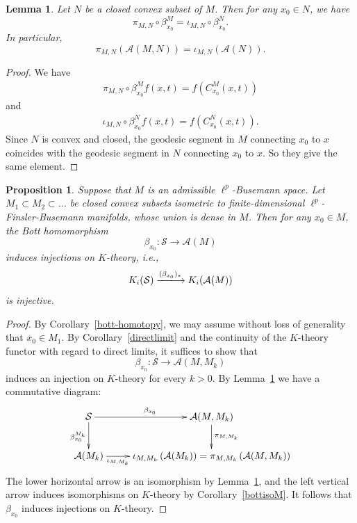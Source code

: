 \documentclass{article}
\theoremstyle{plain}
\newtheorem{lemma}[theorem]{Lemma}
\newtheorem{proposition}[theorem]{Proposition}
\theoremstyle{definition}
\theoremstyle{remark}
\def\A{\mathcal A}
\def\S{\mathcal S}
\begin{document}
	\begin{lemma}\label{AMN-AM}
		Let $N$ be a closed convex subset of $M$. Then for any $x_0 \in N$, we have
		\[
		\pi_{M,N} \circ \beta_{x_0}^M= \iota_{M,N} \circ \beta_{x_0}^N.
		\]
		In particular,
		\[
		\pi_{M,N}(\A(M,N)) = \iota_{M,N}(\A(N)).
		\]
	\end{lemma}
	
	\begin{proof}
		We have
		\begin{align*}
			\pi_{M,N} \circ \beta_{x_0}^Mf(x,t) = f\left(C^M_{x_0}(x,t) \right)
		\end{align*}
		and 
		\begin{align*}
			\iota_{M,N} \circ \beta_{x_0}^Nf(x,t)=f\left(C^N_{x_0}(x,t) \right).
		\end{align*}
		Since $N$ is convex and closed, the geodesic segment in $M$ connecting $x_0$ to $x$ coincides with the geodesic segment in $N$ connecting $x_0$ to $x$. So they give the same element.
	\end{proof}
	
	\begin{proposition}\label{bottinjective}
		Suppose that $M$ is an admissible $\ell^p$-Busemann space. Let $M_1 \subset M_2 \subset \ldots$ be closed convex subsets isometric to finite-dimensional $\ell^p$-Finsler-Busemann manifolds, whose union is dense in $M$. Then for any $x_0 \in M$, the Bott homomorphism 
		\[
		\beta_{x_0}  \colon \S \to \A(M)
		\]
		induces injections on $K$-theory, i.e., 
		\[
		K_i (\S) \xlongrightarrow{(\beta_{x_0} )_*} K_i (\A(M)) 
		\] 
		is injective. 
	\end{proposition}
	\begin{proof}
		By Corollary~\ref{bott-homotopy}, we may assume without loss of generality that $x_0 \in M_1$. By Corollary~\ref{directlimit} and the continuity of the $K$-theory functor with regard to direct limits, it suffices to show that  
		\[
		\beta_{x_0} \colon \S \to \A(M,M_k)
		\]
		induces an injection on $K$-theory for every $k>0$. By Lemma~\ref{AMN-AM} we have a commutative diagram:
		\[
		\xymatrix{
			\S \ar[r]^{\beta_{x_0} } \ar[d]_{\beta_{x_0}^{M_k} } & \A(M,M_k)\ar[d]^{\pi_{M,M_k}} \\
			\A(M_k)\ar[r]_-{\iota_{M,M_k}} &	 \iota_{M,M_k}\left( \A(M_k)\right) = \pi_{M,M_k} \left(\A(M,M_k)\right)
		}
		\]
		The lower horizontal arrow is an isomorphism by Lemma~\ref{AMN-AM}, and the left vertical arrow induces isomorphisms on $K$-theory by Corollary~\ref{bottisoM}. It follows that $\beta_{x_0}$ induces injections on $K$-theory. 
	\end{proof}
\end{document}
